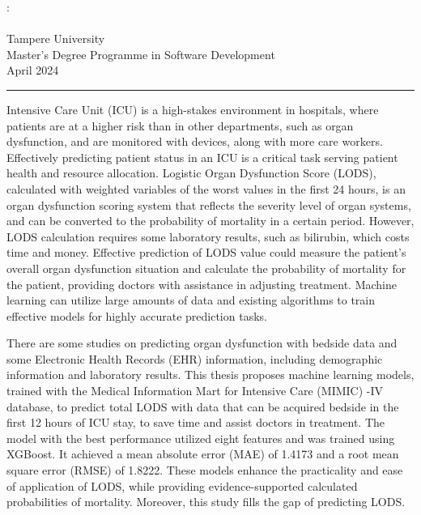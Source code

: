 \documentclass[12pt,a4paper,english
]{tunithesis}
\begin{document}
\begin{spacing}{1.0}
\noindent \@author: \@title\\
\@thesistype\\
Tampere University\\
Master’s Degree Programme in Software Development\\
April 2024
\end{spacing}
\noindent\rule{12cm}{0.4pt}

\vspace{0.5cm}


\noindent Intensive Care Unit (ICU) is a high-stakes environment in hospitals, where patients are at a higher risk than in other departments, such as organ dysfunction, and are monitored with devices, along with more care workers. Effectively predicting patient status in an ICU is a critical task serving patient health and resource allocation. Logistic Organ Dysfunction Score (LODS), calculated with weighted variables of the worst values in the first 24 hours, is an organ dysfunction scoring system that reflects the severity level of organ systems, and can be converted to the probability of mortality in a certain period. However, LODS calculation requires some laboratory results, such as bilirubin, which costs time and money. Effective prediction of LODS value could measure the patient's overall organ dysfunction situation and calculate the probability of mortality for the patient, providing doctors with assistance in adjusting treatment. Machine learning can utilize large amounts of data and existing algorithms to train effective models for highly accurate prediction tasks.

\noindent There are some studies on predicting organ dysfunction with bedside data and some Electronic Health Records (EHR) information, including demographic information and laboratory results. This thesis proposes machine learning models, trained with the Medical Information Mart for Intensive Care (MIMIC) -IV database, to predict total LODS with data that can be acquired bedside in the first 12 hours of ICU stay, to save time and assist doctors in treatment. The model with the best performance utilized eight features and was trained using XGBoost. It achieved a mean absolute error (MAE) of 1.4173 and a root mean square error (RMSE) of 1.8222. These models enhance the practicality and ease of application of LODS, while providing evidence-supported calculated probabilities of mortality. Moreover, this study fills the gap of predicting LODS.
\end{document}
